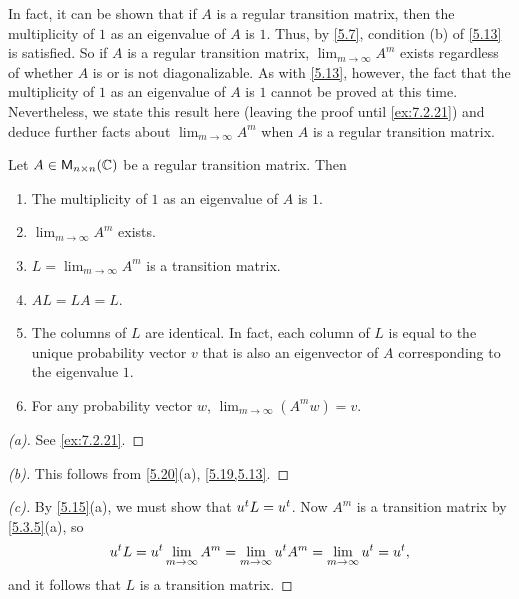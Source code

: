 \begin{note}
	In fact, it can be shown that if \(A\) is a regular transition matrix, then the multiplicity of \(1\) as an eigenvalue of \(A\) is \(1\).
	Thus, by \cref{5.7}, condition (b) of \cref{5.13} is satisfied.
	So if \(A\) is a regular transition matrix, \(\lim_{m \to \infty} A^m\) exists regardless of whether \(A\) is or is not diagonalizable.
	As with \cref{5.13}, however, the fact that the multiplicity of \(1\) as an eigenvalue of \(A\) is \(1\) cannot be proved at this time.
	Nevertheless, we state this result here (leaving the proof until \cref{ex:7.2.21}) and deduce further facts about \(\lim_{m \to \infty} A^m\) when \(A\) is a regular transition matrix.
\end{note}

\begin{thm}\label{5.20}
	Let \(A \in \ms[n][n][\C]\) be a regular transition matrix.
	Then
	\begin{enumerate}
		\item The multiplicity of \(1\) as an eigenvalue of \(A\) is \(1\).
		\item \(\lim_{m \to \infty} A^m\) exists.
		\item \(L = \lim_{m \to \infty} A^m\) is a transition matrix.
		\item \(AL = LA = L\).
		\item The columns of \(L\) are identical.
		      In fact, each column of \(L\) is equal to the unique probability vector \(v\) that is also an eigenvector of \(A\) corresponding to the eigenvalue \(1\).
		\item For any probability vector \(w\), \(\lim_{m \to \infty} (A^m w) = v\).
	\end{enumerate}
\end{thm}

\begin{proof}[(a)]
	See \cref{ex:7.2.21}.
\end{proof}

\begin{proof}[(b)]
	This follows from \cref{5.20}(a), \cref{5.19,5.13}.
\end{proof}

\begin{proof}[(c)]
	By \cref{5.15}(a), we must show that \({u}^{t} L = {u}^{t}\).
	Now \(A^m\) is a transition matrix by \cref{5.3.5}(a), so
	\[
		{u}^{t} L = {u}^{t} \lim_{m \to \infty} A^m = \lim_{m \to \infty} {u}^{t} A^m = \lim_{m \to \infty} {u}^{t} = {u}^{t},
	\]
	and it follows that \(L\) is a transition matrix.
\end{proof}

